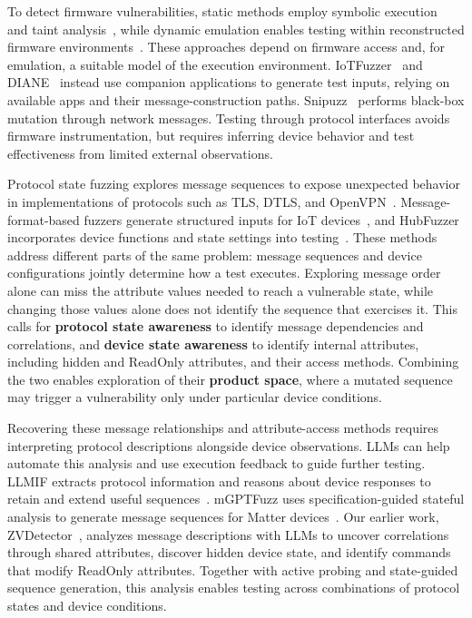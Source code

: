 \documentclass[10pt,journal,compsoc]{IEEEtran}
\begin{document}
To detect firmware vulnerabilities, static methods employ symbolic execution~\cite{davidson2013fie,hernandez2017firmusb} and taint analysis~\cite{cheng2018dtaint}, while dynamic emulation enables testing within reconstructed firmware environments~\cite{kim2020firmae,zheng2019firm}. These approaches depend on firmware access and, for emulation, a suitable model of the execution environment. IoTFuzzer~\cite{chen2018iotfuzzer} and DIANE~\cite{redini2021diane} instead use companion applications to generate test inputs, relying on available apps and their message-construction paths. Snipuzz~\cite{feng2021snipuzz} performs black-box mutation through network messages. Testing through protocol interfaces avoids firmware instrumentation, but requires inferring device behavior and test effectiveness from limited external observations.

Protocol state fuzzing explores message sequences to expose unexpected behavior in implementations of protocols such as TLS, DTLS, and OpenVPN~\cite{de2015protocol,fiterau2020analysis,daniel2018inferring}. Message-format-based fuzzers generate structured inputs for IoT devices~\cite{ren2021z,wang2022don,meng2024large}, and HubFuzzer incorporates device functions and state settings into testing~\cite{ma2023no}. These methods address different parts of the same problem: message sequences and device configurations jointly determine how a test executes. Exploring message order alone can miss the attribute values needed to reach a vulnerable state, while changing those values alone does not identify the sequence that exercises it. This calls for \textbf{protocol state awareness} to identify message dependencies and correlations, and \textbf{device state awareness} to identify internal attributes, including hidden and ReadOnly attributes, and their access methods. Combining the two enables exploration of their \textbf{product space}, where a mutated sequence may trigger a vulnerability only under particular device conditions. 

Recovering these message relationships and attribute-access methods requires interpreting protocol descriptions alongside device observations. LLMs can help automate this analysis and use execution feedback to guide further testing. LLMIF extracts protocol information and reasons about device responses to retain and extend useful sequences~\cite{wang2024llmif}. mGPTFuzz uses specification-guided stateful analysis to generate message sequences for Matter devices~\cite{mgptfuzz}. Our earlier work, ZVDetector~\cite{zvdetector}, analyzes message descriptions with LLMs to uncover correlations through shared attributes, discover hidden device state, and identify commands that modify ReadOnly attributes. Together with active probing and state-guided sequence generation, this analysis enables testing across combinations of protocol states and device conditions.
\end{document}
